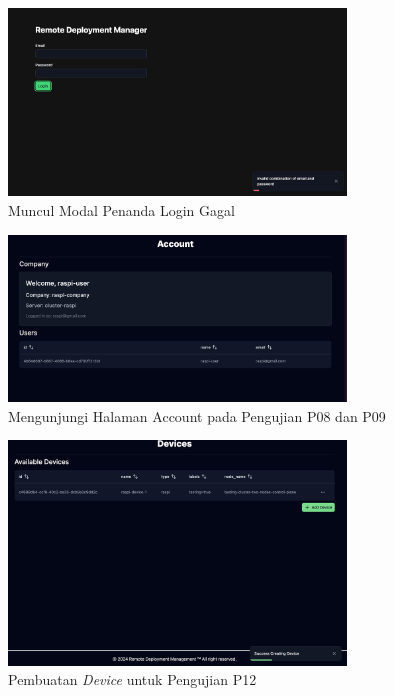 \begin{figure}[ht]
  \centering
  \includegraphics[width=0.8\textwidth]{resources/chapter-4/pengujian/p08.jpg}
  \caption{Muncul Modal Penanda Login Gagal}
  \label{fig:pengujian-p08}
\end{figure}

\begin{figure}[ht]
  \centering
  \includegraphics[width=0.8\textwidth]{resources/chapter-4/pengujian/p08-09.jpg}
  \caption{Mengunjungi Halaman Account pada Pengujian P08 dan P09}
  \label{fig:pengujian-p08-09}
\end{figure}

\begin{figure}[ht]
  \centering
  \includegraphics[width=0.8\textwidth]{resources/chapter-4/pengujian/p12-success.jpg}
  \caption{Pembuatan \textit{Device} untuk Pengujian P12}
  \label{fig:pengujian-p12-success}
\end{figure}

